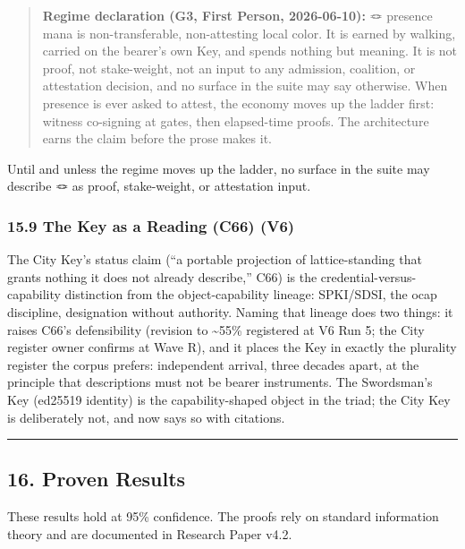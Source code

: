 \documentclass[
]{article}
\begin{document}
\begin{quote}
\textbf{Regime declaration (G3, First Person, 2026-06-10):} 🪢 presence
mana is non-transferable, non-attesting local color. It is earned by
walking, carried on the bearer's own Key, and spends nothing but
meaning. It is not proof, not stake-weight, not an input to any
admission, coalition, or attestation decision, and no surface in the
suite may say otherwise. When presence is ever asked to attest, the
economy moves up the ladder first: witness co-signing at gates, then
elapsed-time proofs. The architecture earns the claim before the prose
makes it.
\end{quote}

Until and unless the regime moves up the ladder, no surface in the suite
may describe 🪢 as proof, stake-weight, or attestation input.

\subsubsection{15.9 The Key as a Reading (C66)
(V6)}\label{the-key-as-a-reading-c66-v6}

The City Key's status claim (``a portable projection of lattice-standing
that grants nothing it does not already describe,'' C66) is the
credential-versus-capability distinction from the object-capability
lineage: SPKI/SDSI, the ocap discipline, designation without authority.
Naming that lineage does two things: it raises C66's defensibility
(revision to \textasciitilde55\% registered at V6 Run 5; the City
register owner confirms at Wave R), and it places the Key in exactly the
plurality register the corpus prefers: independent arrival, three
decades apart, at the principle that descriptions must not be bearer
instruments. The Swordsman's Key (ed25519 identity) is the
capability-shaped object in the triad; the City Key is deliberately not,
and now says so with citations.

\begin{center}\rule{0.5\linewidth}{0.5pt}\end{center}

\subsection{16. Proven Results}\label{proven-results}

These results hold at 95\% confidence. The proofs rely on standard
information theory and are documented in Research Paper v4.2.
\end{document}
